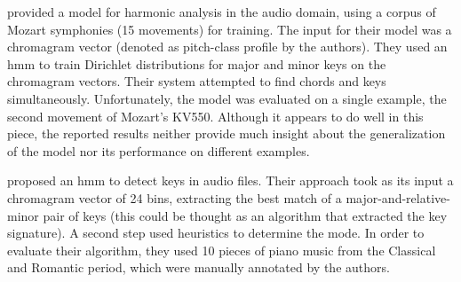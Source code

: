 

\textcite{burgoyne2005learning} provided a model for
harmonic analysis in the audio domain, using a corpus of
Mozart symphonies (15 movements) for training. The input for
their model was a chromagram vector (denoted as pitch-class
profile by the authors). They used an \acrshort{hmm} to
train Dirichlet distributions for major and minor keys on
the chromagram vectors. Their system attempted to find
chords and keys simultaneously. Unfortunately, the model was
evaluated on a single example, the second movement of
Mozart's KV550. Although it appears to do well in this
piece, the reported results neither provide much insight
about the generalization of the model nor its performance on
different examples.

\textcite{chai2005detection} proposed an \acrshort{hmm} to
detect keys in audio files. Their approach took as its input
a chromagram vector of 24 bins, extracting the best match of
a major-and-relative-minor pair of keys (this could be
thought as an algorithm that extracted the key signature). A
second step used heuristics to determine the mode. In order
to evaluate their algorithm, they used 10 pieces of piano
music from the Classical and Romantic period, which were
manually annotated by the authors.

